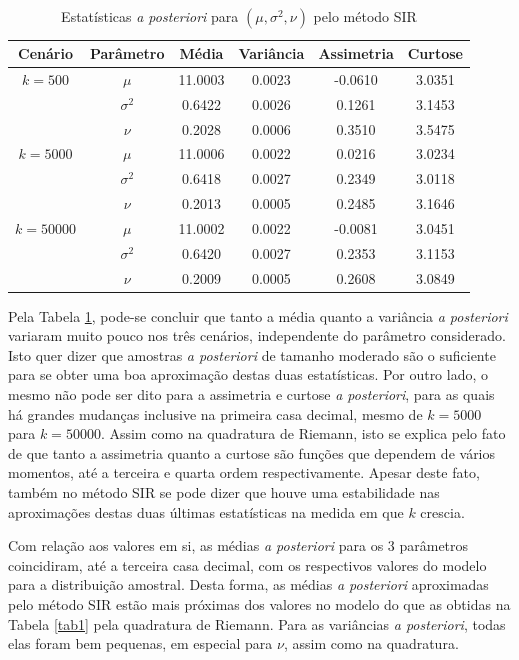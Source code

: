 \begin{table}[t]
	\caption{Estatísticas \textit{a posteriori} para $(\mu, \sigma^2, \nu)$ pelo método SIR}
	\label{tab2}
	\centering
	\begin{tabular}{cccccc}
		\toprule
		Cenário & Parâmetro & Média & Variância & Assimetria & Curtose \\
		\midrule
		$k = 500$ & $\mu$      & 11.0003 & 0.0023 & -0.0610 & 3.0351 \\
		          & $\sigma^2$ &  0.6422 & 0.0026 &  0.1261 & 3.1453 \\
		          & $\nu$      &  0.2028 & 0.0006 &  0.3510 & 3.5475 \\
		\midrule
		$k = 5000$ & $\mu$      & 11.0006 & 0.0022 &  0.0216 & 3.0234 \\
		           & $\sigma^2$ &  0.6418 & 0.0027 &  0.2349 & 3.0118 \\
		           & $\nu$      &  0.2013 & 0.0005 &  0.2485 & 3.1646 \\
		\midrule
		$k = 50000$ & $\mu$      & 11.0002 & 0.0022 & -0.0081 & 3.0451 \\
		            & $\sigma^2$ &  0.6420 & 0.0027 &  0.2353 & 3.1153 \\
		            & $\nu$      &  0.2009 & 0.0005 &  0.2608 & 3.0849 \\
		\bottomrule
	\end{tabular}
\end{table}

Pela Tabela \ref{tab2}, pode-se concluir que tanto a média quanto a variância \textit{a posteriori} variaram muito pouco nos três cenários, independente do parâmetro considerado. Isto quer dizer que amostras \textit{a posteriori} de tamanho moderado são o suficiente para se obter uma boa aproximação destas duas estatísticas. Por outro lado, o mesmo não pode ser dito para a assimetria e curtose \textit{a posteriori}, para as quais há grandes mudanças inclusive na primeira casa decimal, mesmo de $k=5000$ para $k=50000$. Assim como na quadratura de Riemann, isto se explica pelo fato de que tanto a assimetria quanto a curtose são funções que dependem de vários momentos, até a terceira e quarta ordem respectivamente. Apesar deste fato, também no método SIR se pode dizer que houve uma estabilidade nas aproximações destas duas últimas estatísticas na medida em que $k$ crescia.

Com relação aos valores em si, as médias \textit{a posteriori} para os 3 parâmetros coincidiram, até a terceira casa decimal, com os respectivos valores do modelo para a distribuição amostral. Desta forma, as médias \textit{a posteriori} aproximadas pelo método SIR estão mais próximas dos valores no modelo do que as obtidas na Tabela \ref{tab1} pela quadratura de Riemann. Para as variâncias \textit{a posteriori}, todas elas foram bem pequenas, em especial para $\nu$, assim como na quadratura.

